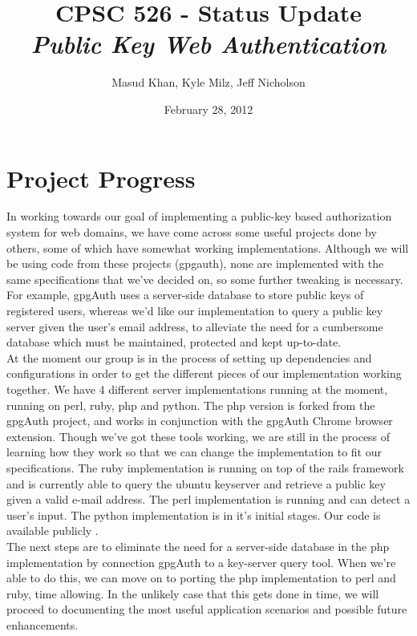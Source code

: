 \documentclass[11pt]{article}
\begin{document}
\title{\bf CPSC 526 - Status Update \\ \emph{Public Key Web Authentication}}
\author{Masud Khan, Kyle Milz, Jeff Nicholson}
\date{February 28, 2012}
\maketitle

\tableofcontents
\pagebreak

\section{Project Progress}
In working towards our goal of implementing a public-key based authorization system for web domains, we have come across some useful projects done by others, some of which have somewhat working implementations.  Although we will be using code from these projects (gpgauth\cite{gpgauth}), none are implemented with the same specifications that we've decided on, so some further tweaking is necessary.  For example, gpgAuth uses a server-side database to store public keys of registered users, whereas we'd like our implementation to query a public key server given the user's email address, to alleviate the need for a cumbersome database which must be maintained, protected and kept up-to-date.\\
	At the moment our group is in the process of setting up dependencies and configurations in order to get the different pieces of our implementation working together.  We have 4 different server implementations running at the moment, running on perl, ruby, php and python.  The php version is forked from the gpgAuth project, and works in conjunction with the gpgAuth Chrome browser extension.  Though we've got these tools working, we are still in the process of learning how they work so that we can change the implementation to fit our specifications.  The ruby implementation is running on top of the rails framework and is currently able to query the ubuntu keyserver and retrieve a public key given a valid e-mail address.  The perl implementation is running and can detect a user's input. The python implementation is in it's initial stages. Our code is available publicly \cite{526proj}.\\
	The next steps are to eliminate the need for a server-side database in the php implementation by connection gpgAuth to a key-server query tool.  When we're able to do this, we can move on to porting the php implementation to perl and ruby, time allowing.  In the unlikely case that this gets done in time, we will proceed to documenting the most useful application scenarios and possible future enhancements.\\
\end{document}
